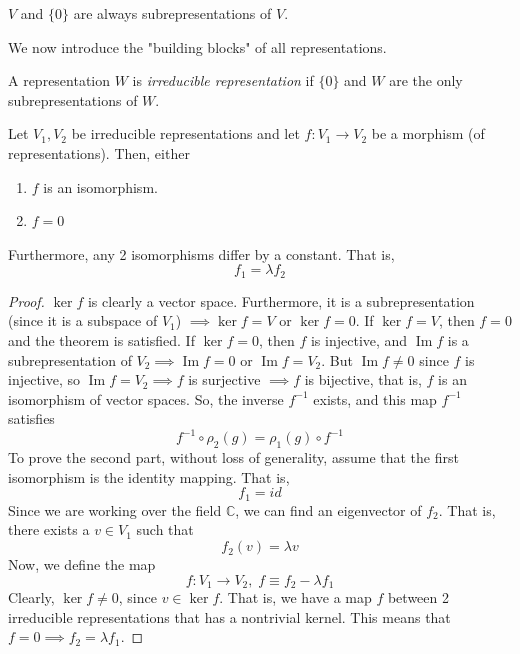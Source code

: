 \documentclass{article}
\DeclareMathOperator{\im}{Im}
\begin{document}
  \begin{example}
    $V$ and $\{0\}$ are always subrepresentations of $V$. 
  \end{example}

  We now introduce the "building blocks" of all representations. 
  \begin{definition}
    A representation $W$ is \textit{irreducible representation} if $\{0\}$ and $W$ are the only subrepresentations of $W$. 
  \end{definition}

  \begin{lemma}
    Let $V_1, V_2$ be irreducible representations and let $f: V_1 \longrightarrow V_2$ be a morphism (of representations). Then, either
    \begin{enumerate}
      \item $f$ is an isomorphism. 
      \item $f = 0$
    \end{enumerate}
    Furthermore, any 2 isomorphisms differ by a constant. That is, 
    \begin{equation}
      f_1 = \lambda f_2
    \end{equation}
  \end{lemma}
  \begin{proof}
    $\ker{f}$ is clearly a vector space. Furthermore, it is a subrepresentation (since it is a subspace of $V_1$) $\implies \ker{f} = V$ or $\ker{f} = 0$. If $\ker{f} = V$, then $f = 0$ and the theorem is satisfied. If $\ker{f} = 0$, then $f$ is injective, and $\im{f}$ is a subrepresentation of $V_2 \implies \im{f} = 0$ or $\im{f} = V_2$. But $\im{f} \neq 0$ since $f$ is injective, so $\im{f} = V_2 \implies f$ is surjective $\implies f$ is bijective, that is, $f$ is an isomorphism of vector spaces. So, the inverse $f^{-1}$ exists, and this map $f^{-1}$ satisfies
    \begin{equation}
      f^{-1} \circ \rho_2(g) = \rho_1 (g) \circ f^{-1}
    \end{equation}
    To prove the second part, without loss of generality, assume that the first isomorphism is the identity mapping. That is, 
    \begin{equation}
      f_1 = id
    \end{equation}
    Since we are working over the field $\mathbb{C}$, we can find an eigenvector of $f_2$. That is, there exists a $v \in V_1$ such that 
    \begin{equation}
      f_2 (v) = \lambda v
    \end{equation}
    Now, we define the map
    \begin{equation}
      f: V_1 \longrightarrow V_2, \; f \equiv f_2 - \lambda f_1
    \end{equation}
    Clearly, $\ker{f} \neq 0$, since $v \in \ker{f}$. That is, we have a map $f$ between 2 irreducible representations that has a nontrivial kernel. This means that $f = 0 \implies f_2 = \lambda f_1$.  
  \end{proof}
\end{document}
